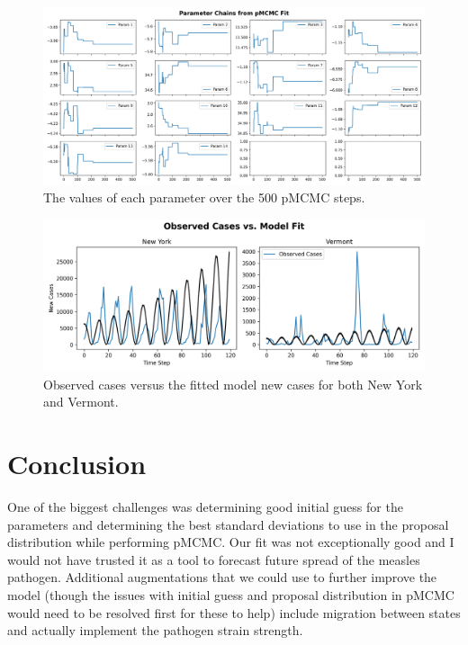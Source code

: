 \documentclass[11pt]{amsart}
\begin{document}
\begin{figure}[h]
	\centering
	\includegraphics[width=1\textwidth]{../visuals/pmcmc_parameter_chains.png}
 	\caption{The values of each parameter over the 500 pMCMC steps.}\label{fig:f2}
\end{figure}

\begin{figure}[h]
	\centering
	\includegraphics[width=1\textwidth]{../visuals/measles_ny_vt_obs_cases_model_fit.png}
 	\caption{Observed cases versus the fitted model new cases for both New York and Vermont.}\label{fig:f3}
\end{figure}

\section{Conclusion}\label{sec:conclustion}
One of the biggest challenges was determining good initial guess for the parameters and determining the best standard deviations to use in the proposal distribution while performing pMCMC.
Our fit was not exceptionally good and I would not have trusted it as a tool to forecast future spread of the measles pathogen.
Additional augmentations that we could use to further improve the model (though the issues with initial guess and proposal distribution in pMCMC would need to be resolved first for these to help) include migration between states and actually implement the pathogen strain strength.
\end{document}
